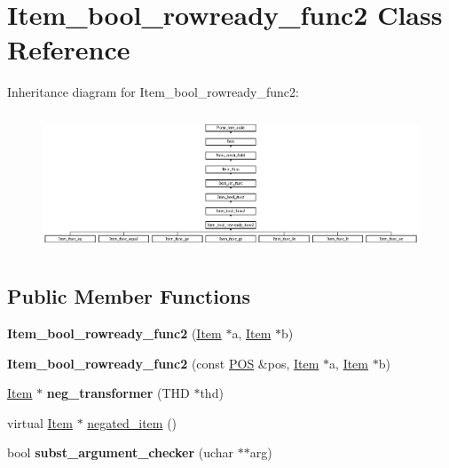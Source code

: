 \hypertarget{classItem__bool__rowready__func2}{}\section{Item\+\_\+bool\+\_\+rowready\+\_\+func2 Class Reference}
\label{classItem__bool__rowready__func2}
Inheritance diagram for Item\+\_\+bool\+\_\+rowready\+\_\+func2\+:\begin{figure}[H]
\begin{center}
\leavevmode
\includegraphics[height=4.161850cm]{classItem__bool__rowready__func2}
\end{center}
\end{figure}
\subsection*{Public Member Functions}
\begin{DoxyCompactItemize}
\item 
\mbox{\label{classItem__bool__rowready__func2_a7d5cfaf0e264604824e233f41d38fe31}} 
{\bfseries Item\+\_\+bool\+\_\+rowready\+\_\+func2} (\mbox{\hyperlink{classItem}{Item}} $\ast$a, \mbox{\hyperlink{classItem}{Item}} $\ast$b)
\item 
\mbox{\label{classItem__bool__rowready__func2_ad412adc029f2270f2c52e7b27762d0a3}} 
{\bfseries Item\+\_\+bool\+\_\+rowready\+\_\+func2} (const \mbox{\hyperlink{structYYLTYPE}{P\+OS}} \&pos, \mbox{\hyperlink{classItem}{Item}} $\ast$a, \mbox{\hyperlink{classItem}{Item}} $\ast$b)
\item 
\mbox{\label{classItem__bool__rowready__func2_adbf3dd2e246c5a34618c74c97da825a2}} 
\mbox{\hyperlink{classItem}{Item}} $\ast$ {\bfseries neg\+\_\+transformer} (T\+HD $\ast$thd)
\item 
virtual \mbox{\hyperlink{classItem}{Item}} $\ast$ \mbox{\hyperlink{classItem__bool__rowready__func2_a93c59c6f9aa848020c85975f792ba85a}{negated\+\_\+item}} ()
\item 
\mbox{\label{classItem__bool__rowready__func2_a58e70ae403628e80015f1d82292650f5}} 
bool {\bfseries subst\+\_\+argument\+\_\+checker} (uchar $\ast$$\ast$arg)
\end{DoxyCompactItemize}
